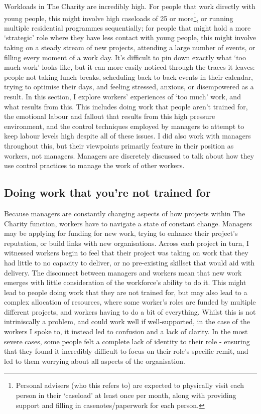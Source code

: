 Workloads in The Charity are incredibly high. For people that work directly with young people, this might involve high caseloads of 25 or more\footnote{Personal advisers (who this refers to) are expected to physically visit each person in their `caseload' at least once per month, along with providing support and filling in casenotes/paperwork for each person. }, or running multiple residential programmes sequentially; for people that might hold a more ‘strategic’ role where they have less contact with young people, this might involve taking on a steady stream of new projects, attending a large number of events, or filling every moment of a work day. It’s difficult to pin down exactly  what ‘too much work’ looks like, but it can more easily noticed through the traces it leaves: people not taking lunch breaks, scheduling back to back events in their calendar, trying to optimise their days, and feeling stressed, anxious, or disempowered as a result. In this section, I explore workers' experiences of `too much' work, and what results from this. This includes doing work that people aren’t trained for, the emotional labour and fallout that results from this high pressure environment, and the control techniques employed by managers to attempt to keep labour levels high despite all of these issues. I did also work with managers throughout this, but their viewpoints primarily feature in their position as workers, not managers. Managers are discretely discussed to talk about how they use control practices to manage the work of other workers.

\subsection{Doing work that you’re not trained for}
Because managers are constantly changing aspects of how projects within The Charity function, workers have to navigate a state of constant change. Managers may be applying for funding for new work, trying to enhance their project’s reputation, or build links with new organisations. Across each project in turn, I witnessed workers begin to feel that their project was taking on work that they had little to no capacity to deliver, or no pre-existing skillset that would aid with delivery. The disconnect between managers and workers mean that new work emerges with little consideration of the workforce's ability to do it. This might lead to people doing work that they are not trained for, but may also lead to a complex allocation of resources, where some worker's roles are funded by multiple different projects, and workers having to do a bit of everything. Whilst this is not intriniscally a problem, and could work well if well-supported, in the case of the workers I spoke to, it instead led to confusion and a lack of clarity. In the most severe cases,  some people felt a complete lack of identity to their role - ensuring that they found it incredibly difficult to focus on their role's specific remit, and led to them worrying about all aspects of the organisation.

